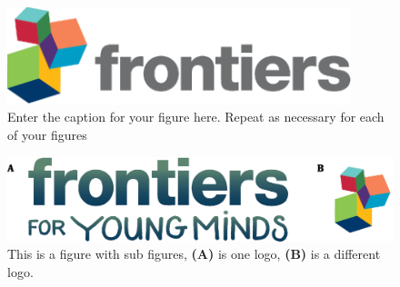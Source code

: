 \documentclass[utf8]{frontiersSCNS} %
\begin{document}
\begin{figure}[h!]
\begin{center}
\includegraphics[width=10cm]{figures/logo1}%
\end{center}
\caption{Enter the caption for your figure here.  Repeat as  necessary for each of your figures}\label{fig:1}
\end{figure}

\begin{figure}[h!]
\begin{center}
\includegraphics[width=15cm]{figures/logos}
\end{center}
\caption{This is a figure with sub figures, \textbf{(A)} is one logo, \textbf{(B)} is a different logo.}\label{fig:2}
\end{figure}

\end{document}
